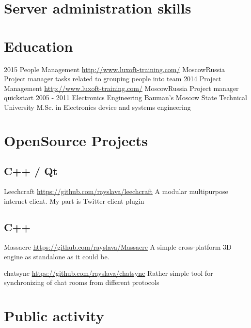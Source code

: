 \documentclass[11pt,a4paper]{moderncv}
\begin{document}




\section{Server administration skills}


\section{Education}
  \cventry
    {2015}
    {People Management}
    {\url{http://www.luxoft-training.com/}}
    {Moscow}{Russia}
    {Project manager tasks related to grouping people into team}
  \cventry
    {2014}
    {Project Management}
    {\url{http://www.luxoft-training.com/}}
    {Moscow}{Russia}
    {Project manager quickstart}
  \cventry
    {2005 - 2011}
    {Electronics Engineering}
    {Bauman's Moscow State Technical University}
    {}{}
    {M.Sc. in Electronics device and systems engineering}

\section{OpenSource Projects}
\subsection{C++ / Qt}
\cvitem
  {Leechcraft}
  {\url{https://github.com/rayslava/leechcraft}\newline{}
  A modular multipurpose internet client. My part is Twitter client plugin}

\subsection{C++}
\cvitem
  {Massacre}
  {\url{https://github.com/rayslava/Massacre}\newline{}
    A simple cross-platform 3D engine as standalone as it could be.}

\cvitem
  {chatsync}
  {\url{https://github.com/rayslava/chatsync}\newline{}
  Rather simple tool for synchronizing of chat rooms from different protocols}

\section{Public activity}
\end{document}
